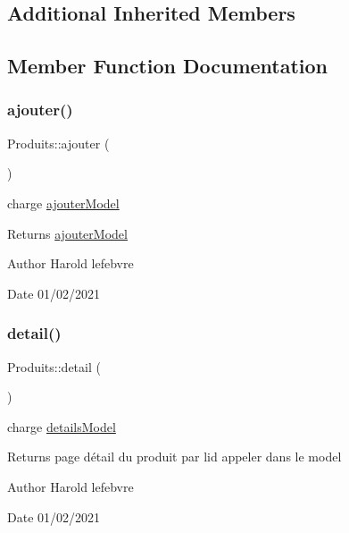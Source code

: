 \subsection*{Additional Inherited Members}


\subsection{Member Function Documentation}
\mbox{\label{class_produits_a0105653ba10d413c43d8d31194fa1c4a}} 
\subsubsection{\texorpdfstring{ajouter()}{ajouter()}}
{\footnotesize\ttfamily Produits\+::ajouter (\begin{DoxyParamCaption}{ }\end{DoxyParamCaption})}



charge \mbox{\hyperlink{classajouter_model}{ajouter\+Model}} 

\begin{DoxyReturn}{Returns}
\mbox{\hyperlink{classajouter_model}{ajouter\+Model}} 
\end{DoxyReturn}
\begin{DoxyAuthor}{Author}
Harold lefebvre 
\end{DoxyAuthor}
\begin{DoxyDate}{Date}
01/02/2021 
\end{DoxyDate}
\mbox{\label{class_produits_a4e56360e0b1070f0bb23c583b259acff}} 
\subsubsection{\texorpdfstring{detail()}{detail()}}
{\footnotesize\ttfamily Produits\+::detail (\begin{DoxyParamCaption}{ }\end{DoxyParamCaption})}



charge \mbox{\hyperlink{classdetails_model}{details\+Model}} 

\begin{DoxyReturn}{Returns}
page détail du produit par l\textquotesingle{}id appeler dans le model 
\end{DoxyReturn}
\begin{DoxyAuthor}{Author}
Harold lefebvre 
\end{DoxyAuthor}
\begin{DoxyDate}{Date}
01/02/2021 
\end{DoxyDate}
\mbox{\label{class_produits_af76bee9668cf04b282e28df92cd187b5}} 
